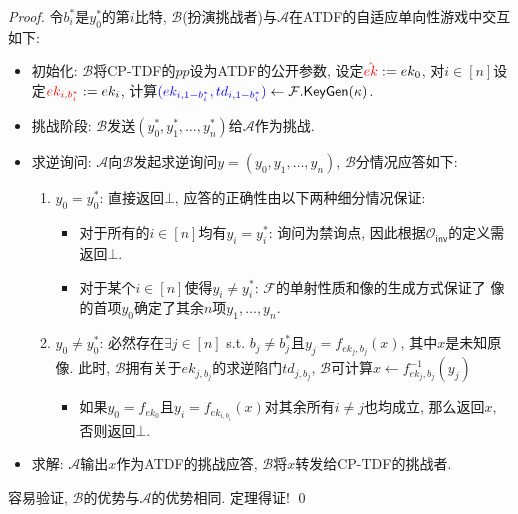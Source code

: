 \begin{proof}
令$b_i^*$是$y_0^*$的第$i$比特, $\mathcal{B}$(扮演挑战者)与$\mathcal{A}$在ATDF的自适应单向性游戏中交互如下: 
\begin{itemize}
\item 初始化: $\mathcal{B}$将CP-TDF的$pp$设为ATDF的公开参数, 
	设定${\color{red} \hat{ek}} := ek_0$, 
	对$i \in [n]$设定${\color{red} ek_{i,b_i^*}} := ek_i$, 
	计算${\color{blue} (ek_{i, 1-b_i^*}, td_{i,1-b_i^*})} \leftarrow \mathcal{F}.\mathsf{KeyGen}(\kappa)$.

\item 挑战阶段: $\mathcal{B}$发送$(y_0^*, y_1^*, \dots, y_n^*)$给$\mathcal{A}$作为挑战. 

\item 求逆询问: $\mathcal{A}$向$\mathcal{B}$发起求逆询问$y = (y_0, y_1, \dots, y_n)$, 
	$\mathcal{B}$分情况应答如下:  

\begin{enumerate}
    \item $y_0 = y_0^*$: 直接返回$\bot$, 应答的正确性由以下两种细分情况保证: 
	\begin{itemize}
    	\item 对于所有的$i \in [n]$均有$y_i = y_i^*$: 询问为禁询点, 因此根据$\mathcal{O}_\mathsf{inv}$的定义需返回$\bot$.
		\item 对于某个$i \in [n]$使得$y_i \neq y_i^*$: $\mathcal{F}$的单射性质和像的生成方式保证了
			像的首项$y_0$确定了其余$n$项$y_1, \dots, y_n$.  
	\end{itemize}

    \item $y_0 \neq y_0^*$: 必然存在$\exists j \in [n]$ s.t. $b_j \neq b_j^*$且$y_j = f_{{ek_j, b_j}}(x)$, 
    	其中$x$是未知原像. 此时, $\mathcal{B}$拥有关于$ek_{j,b_j}$的求逆陷门$td_{j,b_j}$, 
    	$\mathcal{B}$可计算$x \leftarrow f_{ek_j, b_j}^{-1}(y_j)$
	\begin{itemize}
    	\item 如果$y_0 = f_{ek_0}$且$y_i = f_{ek_{i,b_i}}(x)$对其余所有$i \neq j$也均成立, 
    		那么返回$x$, 否则返回$\bot$. 
	\end{itemize}
\end{enumerate}
\item 求解: $\mathcal{A}$输出$x$作为ATDF的挑战应答, $\mathcal{B}$将$x$转发给CP-TDF的挑战者. 
\end{itemize}
容易验证, $\mathcal{B}$的优势与$\mathcal{A}$的优势相同. 定理得证! \qed
\end{proof}


